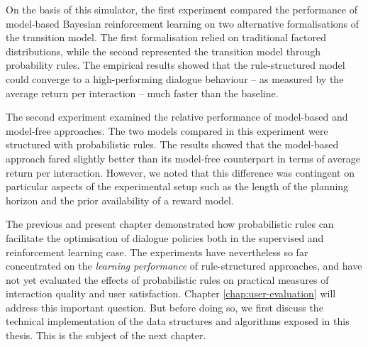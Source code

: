 On the basis of this simulator, the first experiment compared the performance of model-based Bayesian reinforcement learning on two alternative formalisations of the transition model.  The first formalisation relied on traditional factored distributions, while the second represented the transition model through probability rules. The empirical results showed that the rule-structured model could converge to a high-performing dialogue behaviour -- as measured by the average return per interaction -- much faster than the baseline.

The second experiment examined the relative performance of model-based and model-free approaches.  The two models compared in this experiment were structured with probabilistic rules. The results showed that the model-based approach fared slightly better than its model-free counterpart in terms of average return per interaction.  However, we noted that this difference was contingent on particular aspects of the experimental setup such as the length of the planning horizon and the prior availability of a reward model. 

The previous and present chapter demonstrated how probabilistic rules can facilitate the optimisation of dialogue policies both in the supervised and reinforcement learning case. The experiments have nevertheless so far concentrated on the \textit{learning performance} of rule-structured approaches, and have not yet evaluated the effects of probabilistic rules on practical measures of interaction quality and user satisfaction. Chapter \ref{chap:user-evaluation} will address this important question. But before doing so, we first discuss the technical implementation of the data structures and algorithms exposed in this thesis. This is the subject of the next chapter.